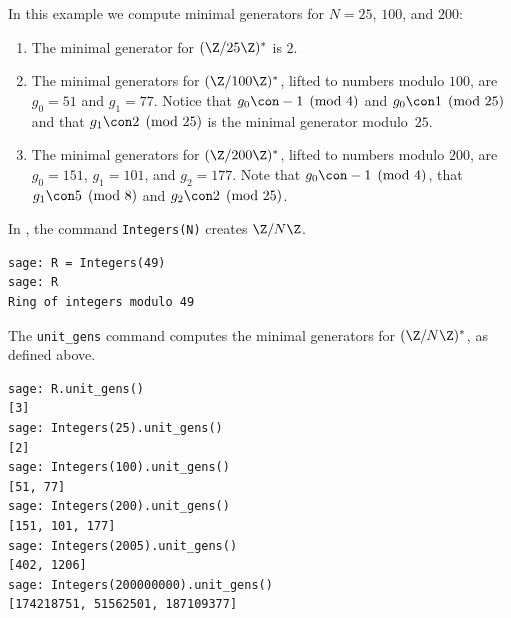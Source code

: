 \begin{example}\label{ex:mingens}
In this example
we compute minimal generators for $N=25$, $100$, and $200$:
\begin{enumerate}
\item
The minimal generator for $(\Z/25\Z)^*$ is $2$.

\item
The minimal generators for $(\Z/100\Z)^*$, lifted
to numbers modulo $100$, are $g_0=51$ and $g_1=77$.
Notice that $g_0\con -1\pmod{4}$ and $g_0\con 1\pmod{25}$
and that $g_1\con 2\pmod{25}$ is the minimal generator modulo~$25$.

\item
The minimal generators for $(\Z/200\Z)^*$, lifted
to numbers modulo $200$, are 
$g_0 = 151$, $g_1 = 101$, and $g_2=177$.  Note
that $g_0\con -1\pmod{4}$, that $g_1\con 5\pmod{8}$
and $g_2\con 2\pmod{25}$.
\end{enumerate}
\end{example}

In \sage, the command {\tt Integers(N)} creates $\Z/N\Z$. 
\begin{verbatim}
sage: R = Integers(49)
sage: R
Ring of integers modulo 49
\end{verbatim}%

The {\tt unit\_gens} command computes the minimal generators 
for $(\Z/N\Z)^*$, as defined above.
\begin{verbatim}
sage: R.unit_gens()
[3]
sage: Integers(25).unit_gens()
[2]
sage: Integers(100).unit_gens()
[51, 77]
sage: Integers(200).unit_gens()
[151, 101, 177]
sage: Integers(2005).unit_gens()
[402, 1206]
sage: Integers(200000000).unit_gens()
[174218751, 51562501, 187109377]
\end{verbatim}

